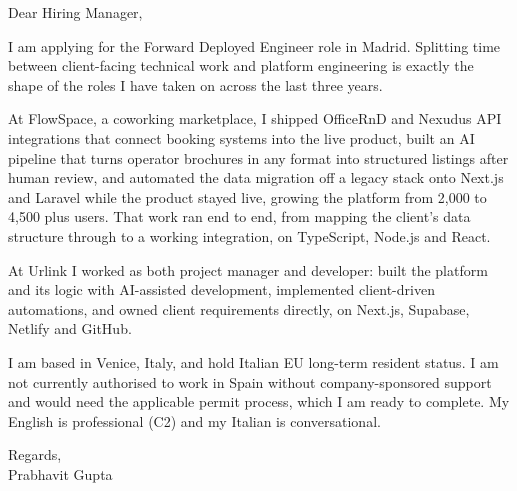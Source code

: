 \documentclass[a4paper,11pt]{article}
\begin{document}
Dear Hiring Manager,

I am applying for the Forward Deployed Engineer role in Madrid. Splitting time between client-facing technical work and platform engineering is exactly the shape of the roles I have taken on across the last three years.

At FlowSpace, a coworking marketplace, I shipped OfficeRnD and Nexudus API integrations that connect booking systems into the live product, built an AI pipeline that turns operator brochures in any format into structured listings after human review, and automated the data migration off a legacy stack onto Next.js and Laravel while the product stayed live, growing the platform from 2,000 to 4,500 plus users. That work ran end to end, from mapping the client's data structure through to a working integration, on TypeScript, Node.js and React.

At Urlink I worked as both project manager and developer: built the platform and its logic with AI-assisted development, implemented client-driven automations, and owned client requirements directly, on Next.js, Supabase, Netlify and GitHub.

I am based in Venice, Italy, and hold Italian EU long-term resident status. I am not currently authorised to work in Spain without company-sponsored support and would need the applicable permit process, which I am ready to complete. My English is professional (C2) and my Italian is conversational.

Regards,\\
Prabhavit Gupta
\end{document}
